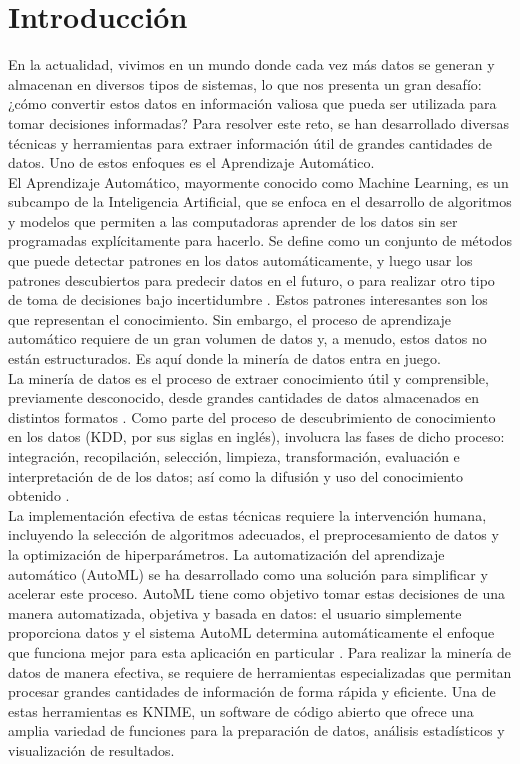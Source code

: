 \chapter*{Introducción}
En la actualidad, vivimos en un mundo donde cada vez más datos se generan y almacenan en diversos tipos de sistemas, lo que nos presenta un gran desafío: ¿cómo convertir estos datos en información valiosa que pueda ser utilizada para tomar decisiones informadas? Para resolver este reto, se han desarrollado diversas técnicas y herramientas para extraer información útil de grandes cantidades de datos. Uno de estos enfoques es el Aprendizaje Automático. \\
El Aprendizaje Automático, mayormente conocido como Machine Learning, es un subcampo de la Inteligencia Artificial, que se enfoca en el desarrollo de algoritmos y modelos que permiten a las computadoras aprender de los datos sin ser programadas explícitamente para hacerlo. Se define como un conjunto de métodos que puede detectar patrones en los datos automáticamente, y luego usar los patrones descubiertos para predecir datos en el futuro, o para realizar otro tipo de toma de decisiones bajo incertidumbre \citep{murphy2012machine}. Estos patrones interesantes son los que representan el conocimiento.  Sin embargo, el proceso de aprendizaje automático requiere de un gran volumen de datos y, a menudo, estos datos no están estructurados. Es aquí donde la minería de datos entra en juego.\\
La minería de datos es el proceso de extraer conocimiento útil y comprensible, previamente desconocido, desde grandes cantidades de datos almacenados en distintos formatos \citep{orallo2004}. Como parte del proceso de descubrimiento de conocimiento en los datos (KDD, por sus siglas en inglés), involucra las fases de dicho proceso: integración, recopilación, selección, limpieza, transformación, evaluación e interpretación de de los datos; así como la difusión y uso del conocimiento obtenido \citep{Han2011}.  \\
La implementación efectiva de estas técnicas requiere la intervención humana, incluyendo la selección de algoritmos adecuados, el preprocesamiento de datos y la optimización de hiperparámetros. La automatización del aprendizaje automático (AutoML) se ha desarrollado como una solución para simplificar y acelerar este proceso. AutoML tiene como objetivo tomar estas decisiones de una manera automatizada, objetiva y basada en datos: el usuario simplemente proporciona datos y el sistema AutoML determina automáticamente el enfoque que funciona mejor para esta aplicación en particular \citep{hutter2019automated}. Para realizar la minería de datos de manera efectiva, se requiere de herramientas especializadas que permitan procesar grandes cantidades de información de forma rápida y eficiente. Una de estas herramientas es KNIME, un software de código abierto que ofrece una amplia variedad de funciones para la preparación de datos, análisis estadísticos y visualización de resultados.\\
